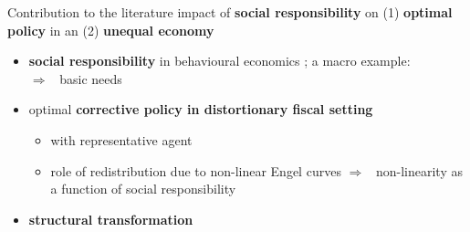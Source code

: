 \documentclass[11pt,aspectratio=169]{beamer}
\newcommand{\ar}{$\Rightarrow$ \ }
\begin{document}
	\begin{frame}{}
		\hypertarget{Contrib}{}
		\vspace{4mm}
		\begin{block}{Contribution to the literature}
			impact of \textbf{\alert{social responsibility}} on  (1) \textbf{\alert{optimal policy}} in an (2) \textbf{\alert{unequal economy}}
		\end{block}
		\begin{itemize}
			\item<1-> \textbf{social responsibility} in behavioural economics \citep{Benabou2010IndividualResponsibility, Bartling2015DoResponsibility, Falk2021FightingValues}; a macro example: \cite{Aghion2021EnvironmentalDirty}\\ \ar basic needs %
			\vspace{2mm}
			\item<1-> optimal \textbf{corrective policy in distortionary fiscal setting}
			
			\begin{itemize}
				\vspace{1mm}
				\item<1->  with representative agent \citep[e.g.][]{ LansBovenberg1994EnvironmentalTaxation, Barrage2019OptimalPolicy} 
				\item<1-> \cite{Vona2011IncomeTechnologies, Jacobs2019RedistributionCurves} role of redistribution due to non-linear Engel curves  \ar non-linearity as a function of social responsibility
			\end{itemize}
			\item<1-> \textbf{structural transformation} \\ \citep{Herrendorf2014GrowthTransformation, Matsuyama2002TheSocieties, Foellmi2008StructuralGrowth, Boppart2014StructuralPreferences}
		\end{itemize}
	\end{frame}
	
\end{document}
